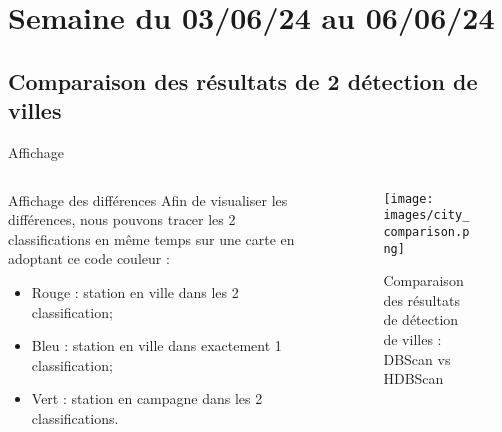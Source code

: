 \smallframetitle

\section{Semaine du 03/06/24 au 06/06/24}
\insertsectionframe

\subsection{Comparaison des résultats de 2 détection de villes}
\insertsubsectionframe

\begin{frame}{Affichage}
    \begin{columns}
        \begin{column}{0.5\textwidth}
            \begin{block}{Affichage des différences}
                Afin de visualiser les différences, nous pouvons tracer les 2 classifications en même temps sur une carte en adoptant ce code couleur :
                \begin{itemize}
                    \item Rouge : station en ville dans les 2 classification;
                    \item Bleu : station en ville dans exactement 1 classification;
                    \item Vert : station en campagne dans les 2 classifications.
                \end{itemize}
            \end{block}
        \end{column}

        \begin{column}{0.5\textwidth}
            \begin{figure}
                \texttt{[image: images/city\_comparison.png]}
                \caption{\label{fig:city-comparison}Comparaison des résultats de détection de villes : DBScan vs HDBScan}
            \end{figure}
        \end{column}
    \end{columns}
    
    
\end{frame}


